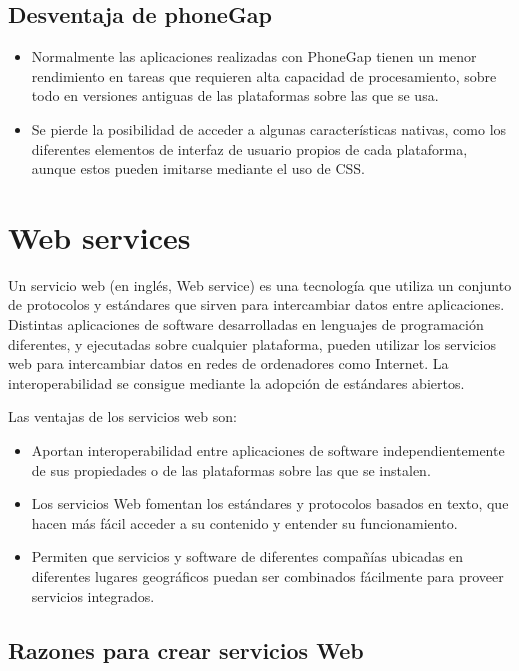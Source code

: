     \subsection{Desventaja de phoneGap}
    \begin{itemize}
\item Normalmente las aplicaciones realizadas con PhoneGap tienen un menor rendimiento en tareas que requieren alta capacidad de procesamiento, sobre todo en versiones antiguas de las plataformas sobre las que se usa.

\item Se pierde la posibilidad de acceder a algunas características nativas, como los diferentes elementos de interfaz de usuario propios de cada plataforma, aunque estos pueden imitarse mediante el uso de CSS.
\end{itemize}

\section{Web services}
\label{sec:webservices}

Un servicio web (en inglés, Web service) es una tecnología que utiliza un conjunto de protocolos y estándares que sirven para intercambiar datos entre aplicaciones. Distintas aplicaciones de software desarrolladas en lenguajes de programación diferentes, y ejecutadas sobre cualquier plataforma, pueden utilizar los servicios web para intercambiar datos en redes de ordenadores como Internet. La interoperabilidad se consigue mediante la adopción de estándares abiertos.

Las ventajas de los servicios web son:

\begin{itemize}
    \item Aportan interoperabilidad entre aplicaciones de software independientemente de sus propiedades o de las plataformas sobre las que se instalen.
    \item Los servicios Web fomentan los estándares y protocolos basados en texto, que hacen más fácil acceder a su contenido y entender su funcionamiento.
    \item Permiten que servicios y software de diferentes compañías ubicadas en diferentes lugares geográficos puedan ser combinados fácilmente para proveer servicios integrados.
   
 \end{itemize}
 
\subsection{Razones para crear servicios Web}


